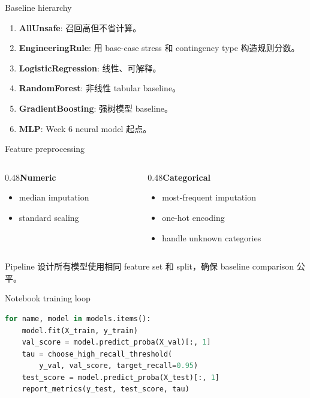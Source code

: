 \documentclass[aspectratio=169,11pt]{beamer}
\begin{document}
\begin{frame}{Baseline hierarchy}
\begin{enumerate}\item \textbf{AllUnsafe}: 召回高但不省计算。\item \textbf{EngineeringRule}: 用 base-case stress 和 contingency type 构造规则分数。\item \textbf{LogisticRegression}: 线性、可解释。\item \textbf{RandomForest}: 非线性 tabular baseline。\item \textbf{GradientBoosting}: 强树模型 baseline。\item \textbf{MLP}: Week 6 neural model 起点。\end{enumerate}
\end{frame}

\begin{frame}{Feature preprocessing}
\begin{columns}\begin{column}{0.48\textwidth}\textbf{Numeric}\begin{itemize}\item median imputation\item standard scaling\end{itemize}\end{column}\begin{column}{0.48\textwidth}\textbf{Categorical}\begin{itemize}\item most-frequent imputation\item one-hot encoding\item handle unknown categories\end{itemize}\end{column}\end{columns}
\begin{block}{Pipeline 设计}所有模型使用相同 feature set 和 split，确保 baseline comparison 公平。\end{block}
\end{frame}

\begin{frame}[fragile]{Notebook training loop}
\begin{lstlisting}[language=Python]
for name, model in models.items():
    model.fit(X_train, y_train)
    val_score = model.predict_proba(X_val)[:, 1]
    tau = choose_high_recall_threshold(
        y_val, val_score, target_recall=0.95)
    test_score = model.predict_proba(X_test)[:, 1]
    report_metrics(y_test, test_score, tau)
\end{lstlisting}
\end{frame}
\end{document}
